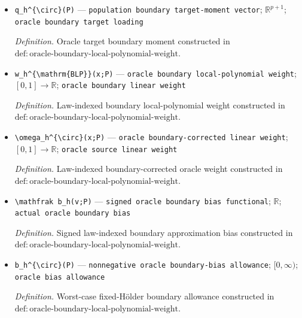 \documentclass{article}
\begin{document}
\begin{itemize}
  \par\smallskip\noindent\emph{Definition.} Oracle boundary Gram matrix constructed in \(\mathrm{def:oracle\text{-}boundary\text{-}local\text{-}polynomial\text{-}weight}\).
  \item \texttt{q\_\allowbreak{}h\textasciicircum{}\{\textbackslash{}\allowbreak{}circ\}\allowbreak{}(P)} --- \texttt{population boundary target-\allowbreak{}moment vector}; \(\mathbb R^{p+1}\); \texttt{oracle boundary target loading}
  \par\smallskip\noindent\emph{Definition.} Oracle target boundary moment constructed in \(\mathrm{def:oracle\text{-}boundary\text{-}local\text{-}polynomial\text{-}weight}\).
  \item \texttt{w\_\allowbreak{}h\textasciicircum{}\{\textbackslash{}\allowbreak{}mathrm\{BLP\}\allowbreak{}\}\allowbreak{}(x;\allowbreak{}P)} --- \texttt{oracle boundary local-\allowbreak{}polynomial weight}; \([0,1]\to\mathbb R\); \texttt{oracle boundary linear weight}
  \par\smallskip\noindent\emph{Definition.} Law-indexed boundary local-polynomial weight constructed in \(\mathrm{def:oracle\text{-}boundary\text{-}local\text{-}polynomial\text{-}weight}\).
  \item \texttt{\textbackslash{}\allowbreak{}omega\_\allowbreak{}h\textasciicircum{}\{\textbackslash{}\allowbreak{}circ\}\allowbreak{}(x;\allowbreak{}P)} --- \texttt{oracle boundary-\allowbreak{}corrected linear weight}; \([0,1]\to\mathbb R\); \texttt{oracle source linear weight}
  \par\smallskip\noindent\emph{Definition.} Law-indexed boundary-corrected oracle weight constructed in \(\mathrm{def:oracle\text{-}boundary\text{-}local\text{-}polynomial\text{-}weight}\).
  \item \texttt{\textbackslash{}\allowbreak{}mathfrak b\_\allowbreak{}h(v;\allowbreak{}P)} --- \texttt{signed oracle boundary bias functional}; \(\mathbb R\); \texttt{actual oracle boundary bias}
  \par\smallskip\noindent\emph{Definition.} Signed law-indexed boundary approximation bias constructed in \(\mathrm{def:oracle\text{-}boundary\text{-}local\text{-}polynomial\text{-}weight}\).
  \item \texttt{b\_\allowbreak{}h\textasciicircum{}\{\textbackslash{}\allowbreak{}circ\}\allowbreak{}(P)} --- \texttt{nonnegative oracle boundary-\allowbreak{}bias allowance}; \([0,\infty)\); \texttt{oracle bias allowance}
  \par\smallskip\noindent\emph{Definition.} Worst-case fixed-Hölder boundary allowance constructed in \(\mathrm{def:oracle\text{-}boundary\text{-}local\text{-}polynomial\text{-}weight}\).

\end{itemize}
\end{document}
